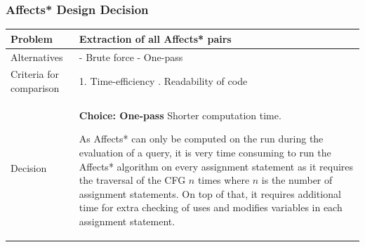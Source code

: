 \documentclass[12pt]{article}
\begin{document}
{{{{{{{{{{{{{\begin{tabular}{|L{5cm} | L{12cm}| }
 \\
 \hline
\end{tabular}



\subsubsection{Affects* Design Decision
}
\begin{tabular}{|L{5cm} | L{12cm}| }
\hline
Problem &
Extraction of all Affects* pairs 	
 \\
    \hline
    Alternatives &
- Brute force
\newline - One-pass


 \\
\hline
    Criteria for comparison &
1. Time-efficiency
. Readability of code
 \\
 \hline
   Decision & \textbf{Choice:  One-pass}
\newline
Shorter computation time.

As Affects* can only be computed on the run during the evaluation of a query, it is very time consuming to run the Affects* algorithm on every assignment statement as it requires the traversal of the CFG $n$ times where $n$ is the number of assignment statements. On top of that, it requires additional time for extra checking of uses and modifies variables in each assignment statement.


 \\
 \hline
\end{tabular}


}}}}}}}}}}}}}
\end{document}
